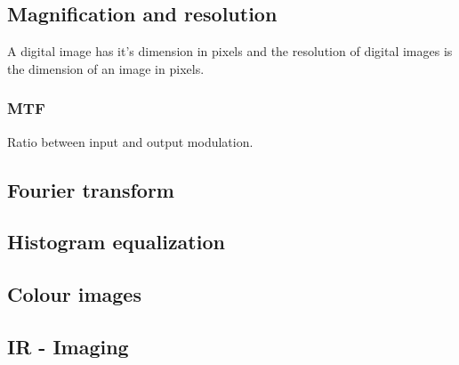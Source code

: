 \subsection{Magnification and resolution}
A digital image has it's dimension in pixels and the resolution of digital images is the dimension of an image in pixels.

\subsubsection{MTF}
Ratio between input and output modulation. 

\subsection{Fourier transform}

\subsection{Histogram equalization}

\subsection{Colour images}

\subsection{IR - Imaging}